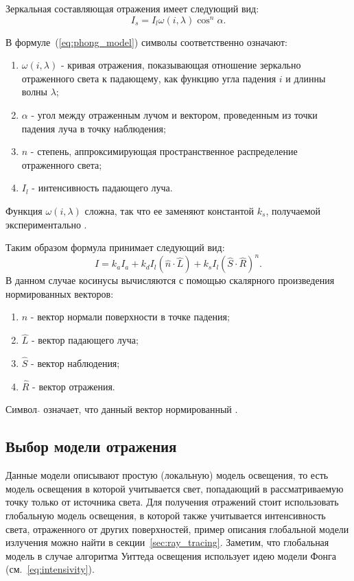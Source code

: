Зеркальная составляющая отражения имеет следующий вид:
\begin{equation} 
	I_s = I_l\omega(i,\lambda)\cos^n \alpha.
	\label{eq:phong_model}
\end{equation}

В формуле~(\ref{eq:phong_model}) символы соответственно означают:
\begin{enumerate} 
	\item $\omega(i,\lambda)$ - кривая отражения, показывающая отношение зеркально отраженного света к падающему, как функцию угла падения $i$ и длинны волны $\lambda$;
	\item $\alpha$ - угол между отраженным лучом и вектором, проведенным из точки падения луча в точку наблюдения;
	\item $n$ - степень, аппроксимирующая пространственное распределение отраженного света;
	\item $I_l$ - интенсивность падающего луча.
\end{enumerate}
Функция $\omega(i,\lambda)$ сложна, так что ее заменяют константой $k_s$, получаемой экспериментально \cite{Rodgers}.


Таким образом формула принимает следующий вид:
\begin{equation} 
	I = k_aI_a + k_dI_{l}(\hat{n} \cdot \hat{L}) + k_s  I_{l}(\hat{S} \cdot \hat{R})^n.
\end{equation}
В данном случае косинусы вычисляются с помощью скалярного произведения нормированных векторов:
\begin{enumerate}
	\item $\hat{n}$ - вектор нормали поверхности в точке падения;
	\item $\hat{L}$ - вектор падающего луча;
	\item $\hat{S}$ - вектор наблюдения;
	\item $\hat{R}$ - вектор отражения.
\end{enumerate}
Символ $\hat{}$ означает, что данный вектор нормированный \cite{Rodgers}.




\subsection{Выбор модели отражения}
Данные модели описывают простую (локальную) модель освещения, то есть модель освещения в которой учитывается свет, попадающий в рассматриваемую точку только от источника света.
Для получения отражений стоит использовать глобальную модель освещения, в которой также учитывается интенсивность света, отраженного от других поверхностей, пример описания глобальной модели излучения можно найти в секции~\ref{sec:ray_tracing}.
Заметим, что глобальная модель в случае алгоритма Уиттеда освещения использует идею модели Фонга (см.~\ref{eq:intensivity}).






